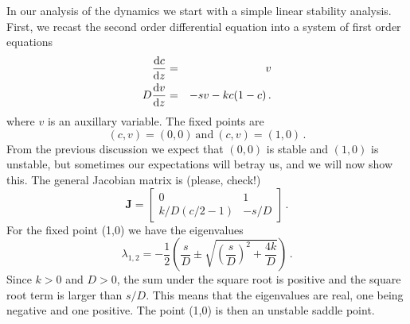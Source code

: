 In our analysis of the dynamics we start with a simple linear stability
analysis. First, we recast the second order differential equation into a system of first order equations 
\begin{eqnarray}
  \frac{\mathrm{d} c}{\mathrm{d} z} &=& v \nonumber \\
  D\frac{\mathrm{d} v}{\mathrm{d} z} &=& -sv - kc(1-c) \, .
\end{eqnarray}
where $v$ is an auxillary variable. The fixed points are 
\begin{equation}
  (c, v)=(0,0)  \ \text{and} \   (c, v)=(1,0) \, .
\end{equation}
From the previous discussion we expect that $(0,0)$ is stable and $(1,0)$ is
unstable, but sometimes our expectations will betray us, and we will now show this. 
The general Jacobian matrix is (please, check!)
\begin{equation}
  \mathbf{J} =
  \begin{bmatrix}
    0 & 1 \\
    k/D(c/2-1) & -s/D
    \end{bmatrix} \, .
\end{equation}
For the fixed point (1,0) we have the eigenvalues
\begin{equation}
  \lambda_{1,2}=-\frac{1}{2}\left(
    \frac{s}{D} \pm \sqrt{\left(\frac{s}{D}\right)^2 + \frac{4k}{D}} 
  \right) \, .
\end{equation}
Since $k>0$ and $D>0$, the sum under the square root is positive and the square root term is 
larger than $s/D$. This means that the eigenvalues are real, one being negative and one positive.
The point (1,0) is then an unstable saddle point. 

